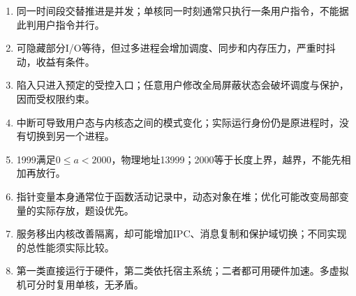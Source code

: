 \begin{enumerate}
\def\labelenumi{\arabic{enumi}.}
\tightlist
\item
  同一时间段交替推进是并发；单核同一时刻通常只执行一条用户指令，不能据此判用户指令并行。
\item
  可隐藏部分I/O等待，但过多进程会增加调度、同步和内存压力，严重时抖动，收益有条件。
\item
  陷入只进入预定的受控入口；任意用户修改全局屏蔽状态会破坏调度与保护，因而受权限约束。
\item
  中断可导致用户态与内核态之间的模式变化；实际运行身份仍是原进程时，没有切换到另一个进程。
\item
  1999满足\(0\le a<2000\)，物理地址13999；2000等于长度上界，越界，不能先相加再放行。
\item
  指针变量本身通常位于函数活动记录中，动态对象在堆；优化可能改变局部变量的实际存放，题设优先。
\item
  服务移出内核改善隔离，却可能增加IPC、消息复制和保护域切换；不同实现的总性能须实际比较。
\item
  第一类直接运行于硬件，第二类依托宿主系统；二者都可用硬件加速。多虚拟机可分时复用单核，无矛盾。
\end{enumerate}
